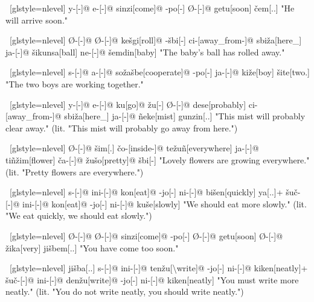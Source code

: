 \ex~[glstyle=nlevel]
\begingl
\glpreamble {}
\endpreamble
y-[{\Subj}-]@
e-[{\Pfv}-]@
sinzi[come]@
-po[-{\Hg}]
Ø-[{\Pfv}-]@
getu[soon]
\v{c}em[{\T}.{\Hg}.{\Nom}]
\glft "He will arrive soon."
\endgl
\xe

\ex~[glstyle=nlevel]
\begingl
\glpreamble {}
\endpreamble
Ø-[{\Ind}-]@
Ø-[{\Pfv}-]@
ke\v{s}gi[roll]@
-\v{s}bi[-{\Inan}]
ci-[away\_from-]@
sbi\v{z}a[here\_{\Prox}]
ja-[{\Nom}-]@
\v{s}ikunsa[ball]
ne-[{\Gen}-]@
\v{s}emdin[baby]
\glft "The baby's ball has rolled away."
\endgl
\xe

\ex~[glstyle=nlevel]
\begingl
\glpreamble {}
\endpreamble
s-[{\Ind}-]@
a-[{\Prog}-]@
so\v{z}a\v{s}be[cooperate]@
-po[-{\Hg}]
ja-[{\Nom}-]@
ki\v{z}e[boy]
\v{s}ite[two.{\Hg}]
\glft "The two boys are working together."
\endgl
\xe

\ex~[glstyle=nlevel]
\begingl
\glpreamble {}
\endpreamble
y-[{\Subj}-]@
e-[{\Pfv}-]@
ku[go]@
\v{z}u[-{\An}]
Ø-[{\Pfv}-]@
dese[probably]
ci-[away\_from-]@
sbi\v{z}a[here\_{\Prox}]
ja-[{\Nom}-]@
ñeke[mist]
gunzin[{\Dem}.{\Prox}.{\Hg}]
\glft "This mist will probably clear away." (lit. "This mist will probably go away from here.")
\endgl
\xe

\ex~[glstyle=nlevel]
\begingl
\glpreamble {}
\endpreamble
Ø-[{\Ind}-]@
\v{s}im[{\Cop}.{\Loc}]
\v{c}o-[inside-]@
te\v{z}uñ[everywhere]
ja-[{\Nom}-]@
tiñ\v{z}im[flower]
\v{c}a-[{\Nom}-]@
\v{z}u\v{s}o[pretty]@
\v{s}bi[-{\Inan}]
\glft "Lovely flowers are growing everywhere." (lit. "Pretty flowers are everywhere.")
\endgl
\xe

\ex~[glstyle=nlevel]
\begingl
\glpreamble {}
\endpreamble
s-[{\Ind}-]@
ini-[{\Hab}-]@
kon[eat]@
-jo[-{\Hg}]
ni-[{\Hab}-]@
bi\v{s}en[quickly]
ya[{\Fin}.{\Hg}.{\Erg}]+
\v{s}u\v{c}-[{\Deo}-]@
ini-[{\Hab}-]@
kon[eat]@
-jo[-{\Hg}]
ni-[{\Hab}-]@
ku\v{s}e[slowly]
\glft "We should eat more slowly." (lit. "We eat quickly, we should eat slowly.")
\endgl
\xe

\ex~[glstyle=nlevel]
\begingl
\glpreamble {}
\endpreamble
Ø-[{\Ind}-]@
Ø-[{\Pfv}-]@
sinzi[come]@
-po[-{\Hg}]
Ø-[{\Pfv}-]@
getu[soon]
Ø-[{\Pfv}-]@
\v{z}ika[very]
ji\v{s}bem[{\Spol}.{\Hg}.{\Nom}]
\glft "You have come too soon."
\endgl
\xe

\ex~[glstyle=nlevel]
\begingl
\glpreamble {}
\endpreamble
ji\v{s}ba[{\Spol}.{\Hg}.{\Erg}]
s-[{\Ind}-]@
ini-[{\Hab}-]@
ten\v{z}u[{\Neg}\textbackslash write]@
-jo[-\Hg]
ni-[{\Hab}-]@
kiken[neatly]+
\v{s}u\v{c}-[{\Deo}-]@
ini-[{\Hab}-]@
den\v{z}u[write]@
-jo[-\Hg]
ni-[{\Hab}-]@
kiken[neatly]
\glft "You must write more neatly." (lit. "You do not write neatly, you should write neatly.")
\endgl
\xe


\endgroup
\iffalse


\ex~[glstyle=nlevel]
\begingl
\glpreamble \SGwithRom{}
\endpreamble

\glft ""
\endgl
\xe


\fi
